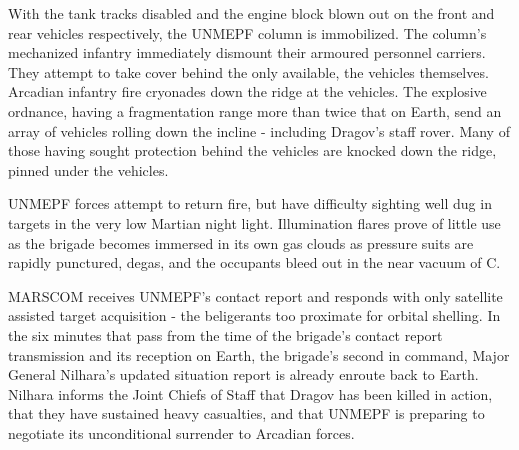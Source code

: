 With the tank tracks disabled and the engine block blown out on the front and rear vehicles respectively, the UNMEPF column is immobilized. The column's mechanized infantry immediately dismount their armoured personnel carriers. They attempt to take cover behind the only available, the vehicles themselves. Arcadian infantry fire cryonades down the ridge at the vehicles. The explosive ordnance, having a fragmentation range more than twice that on Earth, send an array of vehicles rolling down the incline - including Dragov's staff rover. Many of those having sought protection behind the vehicles are knocked down the ridge, pinned under the vehicles.

UNMEPF forces attempt to return fire, but have difficulty sighting well dug in targets in the very low Martian night light. Illumination flares prove of little use as the brigade becomes immersed in its own gas clouds as pressure suits are rapidly punctured, degas, and the occupants bleed out in the near vacuum of C.

MARSCOM receives UNMEPF's contact report and responds with only satellite assisted target acquisition - the beligerants too proximate for orbital shelling. In the six minutes that pass from the time of the brigade's contact report transmission and its reception on Earth, the brigade's second in command, Major General Nilhara's updated situation report is already enroute back to Earth. Nilhara informs the Joint Chiefs of Staff that Dragov has been killed in action, that they have sustained heavy casualties, and that UNMEPF is preparing to negotiate its unconditional surrender to Arcadian forces.
\StopTimelineDate


